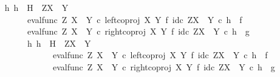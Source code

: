 \begin{isabellebody}
\ \ \ \ \isamarkupfalse%
\ {\isachardoublequoteopen}{\isasymexists}h{\isachardot}{\kern0pt}\ h\ {\isacharcolon}{\kern0pt}\ H\ {\isasymrightarrow}\ Z\isactrlbsup {\isacharparenleft}{\kern0pt}X\ {\isasymCoprod}\ Y{\isacharparenright}{\kern0pt}\isactrlesup \ {\isasymand}\isanewline
\ \ \ \ \ \ \ \ \ \ \ {\isacharparenleft}{\kern0pt}eval{\isacharunderscore}{\kern0pt}func\ Z\ {\isacharparenleft}{\kern0pt}X\ {\isasymCoprod}\ Y{\isacharparenright}{\kern0pt}\ {\isasymcirc}\isactrlsub c\ left{\isacharunderscore}{\kern0pt}coproj\ X\ Y\ {\isasymtimes}\isactrlsub f\ id\isactrlsub c\ {\isacharparenleft}{\kern0pt}Z\isactrlbsup {\isacharparenleft}{\kern0pt}X\ {\isasymCoprod}\ Y{\isacharparenright}{\kern0pt}\isactrlesup {\isacharparenright}{\kern0pt}{\isacharparenright}{\kern0pt}\isactrlsup {\isasymsharp}\ {\isasymcirc}\isactrlsub c\ h\ {\isacharequal}{\kern0pt}\ f\ {\isasymand}\isanewline
\ \ \ \ \ \ \ \ \ \ \ {\isacharparenleft}{\kern0pt}eval{\isacharunderscore}{\kern0pt}func\ Z\ {\isacharparenleft}{\kern0pt}X\ {\isasymCoprod}\ Y{\isacharparenright}{\kern0pt}\ {\isasymcirc}\isactrlsub c\ right{\isacharunderscore}{\kern0pt}coproj\ X\ Y\ {\isasymtimes}\isactrlsub f\ id\isactrlsub c\ {\isacharparenleft}{\kern0pt}Z\isactrlbsup {\isacharparenleft}{\kern0pt}X\ {\isasymCoprod}\ Y{\isacharparenright}{\kern0pt}\isactrlesup {\isacharparenright}{\kern0pt}{\isacharparenright}{\kern0pt}\isactrlsup {\isasymsharp}\ {\isasymcirc}\isactrlsub c\ h\ {\isacharequal}{\kern0pt}\ g\ {\isasymand}\isanewline
\ \ \ \ \ \ \ \ \ \ \ {\isacharparenleft}{\kern0pt}{\isasymforall}h{}{\isachardot}{\kern0pt}\ h{}\ {\isacharcolon}{\kern0pt}\ H\ {\isasymrightarrow}\ Z\isactrlbsup {\isacharparenleft}{\kern0pt}X\ {\isasymCoprod}\ Y{\isacharparenright}{\kern0pt}\isactrlesup \ {\isasymand}\isanewline
\ \ \ \ \ \ \ \ \ \ \ \ \ \ \ \ \ {\isacharparenleft}{\kern0pt}eval{\isacharunderscore}{\kern0pt}func\ Z\ {\isacharparenleft}{\kern0pt}X\ {\isasymCoprod}\ Y{\isacharparenright}{\kern0pt}\ {\isasymcirc}\isactrlsub c\ left{\isacharunderscore}{\kern0pt}coproj\ X\ Y\ {\isasymtimes}\isactrlsub f\ id\isactrlsub c\ {\isacharparenleft}{\kern0pt}Z\isactrlbsup {\isacharparenleft}{\kern0pt}X\ {\isasymCoprod}\ Y{\isacharparenright}{\kern0pt}\isactrlesup {\isacharparenright}{\kern0pt}{\isacharparenright}{\kern0pt}\isactrlsup {\isasymsharp}\ {\isasymcirc}\isactrlsub c\ h{}\ {\isacharequal}{\kern0pt}\ f\ {\isasymand}\isanewline
\ \ \ \ \ \ \ \ \ \ \ \ \ \ \ \ \ {\isacharparenleft}{\kern0pt}eval{\isacharunderscore}{\kern0pt}func\ Z\ {\isacharparenleft}{\kern0pt}X\ {\isasymCoprod}\ Y{\isacharparenright}{\kern0pt}\ {\isasymcirc}\isactrlsub c\ right{\isacharunderscore}{\kern0pt}coproj\ X\ Y\ {\isasymtimes}\isactrlsub f\ id\isactrlsub c\ {\isacharparenleft}{\kern0pt}Z\isactrlbsup {\isacharparenleft}{\kern0pt}X\ {\isasymCoprod}\ Y{\isacharparenright}{\kern0pt}\isactrlesup {\isacharparenright}{\kern0pt}{\isacharparenright}{\kern0pt}\isactrlsup {\isasymsharp}\ {\isasymcirc}\isactrlsub c\ h{}\ {\isacharequal}{\kern0pt}\ g\ {\isasymlongrightarrow}\isanewline

\end{isabellebody}
